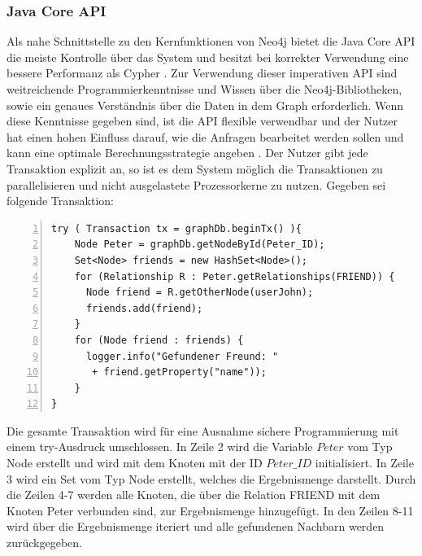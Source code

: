 \subsubsection{Java Core API}
Als nahe Schnittstelle zu den Kernfunktionen von Neo4j bietet die Java Core API die meiste Kontrolle über das System und besitzt bei korrekter Verwendung eine bessere Performanz als Cypher \parencite{vukotic2015neo4j}. Zur Verwendung dieser imperativen API sind weitreichende Programmierkenntnisse und Wissen über die Neo4j-Bibliotheken, sowie ein genaues Verständnis  über die Daten in dem Graph erforderlich. Wenn diese Kenntnisse gegeben sind, ist die API flexible verwendbar  und der Nutzer hat einen hohen Einfluss darauf, wie die Anfragen bearbeitet werden sollen und kann eine optimale Berechnungsstrategie angeben \parencite{vukotic2015neo4j}. Der Nutzer gibt jede Transaktion explizit an, so ist es dem System möglich die Transaktionen zu parallelisieren und nicht ausgelastete Prozessorkerne zu nutzen. Gegeben sei folgende Transaktion: \newline
\begin{Verbatim}[frame=single,numbers=left,xleftmargin=5mm]
try ( Transaction tx = graphDb.beginTx() ){ 
	Node Peter = graphDb.getNodeById(Peter_ID);
	Set<Node> friends = new HashSet<Node>();
	for (Relationship R : Peter.getRelationships(FRIEND)) {  
	  Node friend = R.getOtherNode(userJohn);
	  friends.add(friend);
	}
	for (Node friend : friends) {
	  logger.info("Gefundener Freund: "
	   + friend.getProperty("name")); 
	}
}
\end{Verbatim}
\noindent Die gesamte Transaktion wird für eine Ausnahme sichere Programmierung mit einem try-Ausdruck umschlossen. In Zeile 2 wird die Variable $Peter$ vom Typ Node erstellt und wird mit dem Knoten mit der ID $Peter\_ID$ initialisiert. In Zeile 3 wird ein Set vom Typ Node erstellt, welches die Ergebnismenge darstellt. Durch die Zeilen 4-7 werden alle Knoten, die über die Relation FRIEND mit dem Knoten Peter verbunden sind, zur Ergebnismenge hinzugefügt. In den Zeilen 8-11 wird über die Ergebnismenge  iteriert und  alle gefundenen Nachbarn werden zurückgegeben. 

